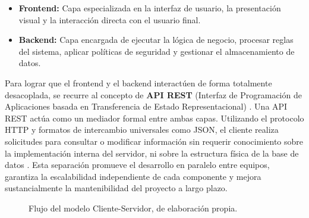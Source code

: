 	\begin{itemize}
		\item \textbf{Frontend:} Capa especializada en la interfaz de usuario, la presentaci\'on visual y la interacci\'on directa con el usuario final.
		\item \textbf{Backend:} Capa encargada de ejecutar la l\'ogica de negocio, procesar reglas del sistema, aplicar pol\'iticas de seguridad y gestionar el almacenamiento de datos.
	\end{itemize}
	
	Para lograr que el frontend y el backend interact\'uen de forma totalmente desacoplada, se recurre al concepto de \textbf{API REST} (Interfaz de Programaci\'on de Aplicaciones basada en Transferencia de Estado Representacional) \cite{mdn-rest, ibm-rest}. Una API REST act\'ua como un mediador formal entre ambas capas. Utilizando el protocolo HTTP y formatos de intercambio universales como JSON, el cliente realiza solicitudes para consultar o modificar informaci\'on sin requerir conocimiento sobre la implementaci\'on interna del servidor, ni sobre la estructura f\'isica de la base de datos \cite{mdn-rest}. Esta separaci\'on promueve el desarrollo en paralelo entre equipos, garantiza la escalabilidad independiente de cada componente y mejora sustancialmente la mantenibilidad del proyecto a largo plazo.	\\
	
	\begin{figure}[htbp]
		\centering
		\caption{Flujo del modelo Cliente-Servidor, de elaboraci\'on propia.}
		\label{fig:flujo_api_rest}
	\end{figure}
	

